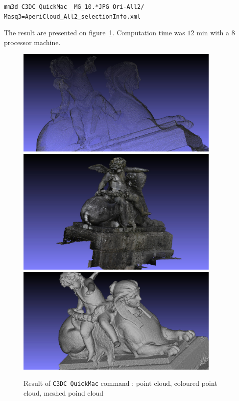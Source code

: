 \begin{verbatim}
mm3d C3DC QuickMac _MG_10.*JPG Ori-All2/ Masq3=AperiCloud_All2_selectionInfo.xml
\end{verbatim}


The result are presented on figure~\ref{FIG:Angel:Result}. Computation time was $12$ min with a $8$ processor machine.




\begin{figure}
\begin{center}
\includegraphics[width=100mm]{FIGS/Ange/snapshot00.jpg}
\includegraphics[width=100mm]{FIGS/Ange/snapshot01.jpg}
\includegraphics[width=100mm]{FIGS/Ange/snapshot201.jpg}
\end{center}
\caption{Result of {\tt C3DC QuickMac} command : point cloud, coloured point cloud, meshed poind cloud}
\label{FIG:Angel:Result}
\end{figure}

